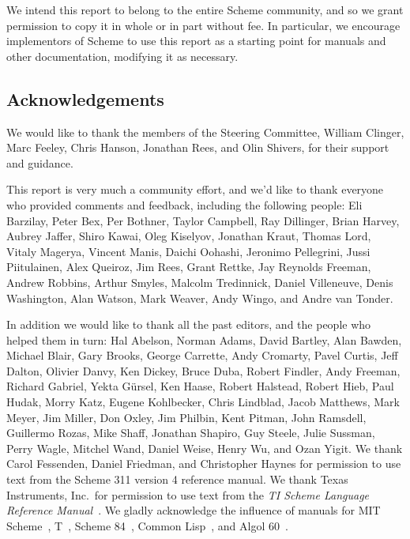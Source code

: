 \medskip

We intend this report to belong to the entire Scheme community, and so
we grant permission to copy it in whole or in part without fee.  In
particular, we encourage implementors of Scheme to use this report as
a starting point for manuals and other documentation, modifying it as
necessary.




\subsection*{Acknowledgements}

We would like to thank the members of the Steering Committee, William
Clinger, Marc Feeley, Chris Hanson, Jonathan Rees, and Olin Shivers, for
their support and guidance.

This report is very much a community effort, and we'd like to thank
everyone who provided comments and feedback, including the following people:
Eli Barzilay, Peter Bex, Per Bothner, Taylor Campbell, Ray Dillinger,
Brian Harvey, Aubrey Jaffer, Shiro Kawai, Oleg Kiselyov, Jonathan
Kraut, Thomas Lord, Vitaly Magerya, Vincent Manis, Daichi Oohashi,
Jeronimo Pellegrini, Jussi Piitulainen, Alex Queiroz, Jim Rees, Grant
Rettke, Jay Reynolds Freeman, Andrew Robbins, Arthur Smyles, Malcolm
Tredinnick, Daniel Villeneuve, Denis Washington, Alan Watson, Mark
Weaver, Andy Wingo, and Andre van Tonder.

In addition we would like to thank all the past editors, and the
people who helped them in turn: Hal Abelson, Norman Adams, David
Bartley, Alan Bawden, Michael Blair, Gary Brooks, George Carrette,
Andy Cromarty, Pavel Curtis, Jeff Dalton, Olivier Danvy, Ken Dickey,
Bruce Duba, Robert Findler, Andy Freeman, Richard Gabriel, Yekta
G\"ursel, Ken Haase, Robert Halstead, Robert Hieb, Paul Hudak, Morry
Katz, Eugene Kohlbecker, Chris Lindblad, Jacob Matthews, Mark Meyer,
Jim Miller, Don Oxley, Jim Philbin, Kent Pitman, John Ramsdell,
Guillermo Rozas, Mike Shaff, Jonathan Shapiro, Guy Steele, Julie
Sussman, Perry Wagle, Mitchel Wand, Daniel Weise, Henry Wu, and Ozan
Yigit.  We thank Carol Fessenden, Daniel Friedman, and Christopher
Haynes for permission to use text from the Scheme 311 version 4
reference manual.  We thank Texas Instruments, Inc.~for permission to
use text from the {\em TI Scheme Language Reference
Manual}~\cite{TImanual85}.  We gladly acknowledge the influence of
manuals for MIT Scheme~\cite{MITScheme}, T~\cite{Rees84}, Scheme
84~\cite{Scheme84}, Common Lisp~\cite{CLtL}, and Algol 60~\cite{Naur63}.

